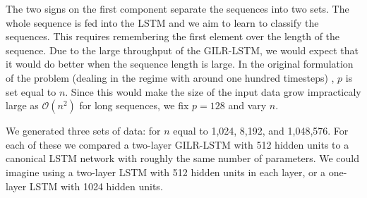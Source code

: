 \documentclass{article}
\begin{document}
The two signs on the first component separate the sequences into two sets. The
whole sequence is fed into the LSTM and we aim to learn to classify the
sequences. This requires remembering the first element over the length of the
sequence. Due to the large throughput of the GILR-LSTM, we would expect that it
would do better when the sequence length is large. In the original formulation
of the problem (dealing in the regime with around one hundred timesteps)
, \(p\) is set equal to \(n\). Since this would make the size of the input data
grow impracticaly large as \(\mathcal{O}(n^2)\) for long sequences, we fix \(p =
128\) and vary \(n\).

We generated three sets of data: for \(n\) equal to 1,024, 8,192, and
1,048,576. For each of these we compared a two-layer GILR-LSTM with 512 hidden
units to a canonical LSTM network with roughly the same number of parameters. We
could imagine using a two-layer LSTM with 512 hidden units in each layer, or a
one-layer LSTM with 1024 hidden units.
\end{document}
